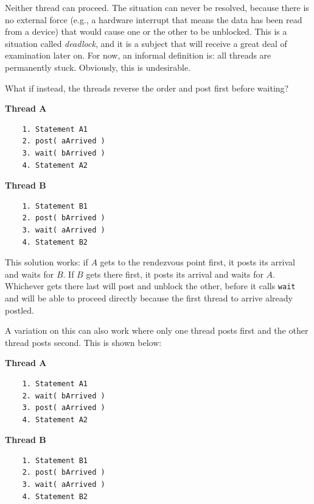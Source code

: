 Neither thread can proceed. The situation can never be resolved, because there is no external force (e.g., a hardware interrupt that means the data has been read from a device) that would cause one or the other to be unblocked. This is a situation called \textit{deadlock}, and it is a subject that will receive a great deal of examination later on. For now, an informal definition is: all threads are permanently stuck. Obviously, this is undesirable.

What if instead, the threads reverse the order and post first before waiting?

\begin{multicols}{2}
\textbf{Thread A}\vspace{-2em}
  \begin{verbatim}
	1. Statement A1
	2. post( aArrived )
	3. wait( bArrived )
	4. Statement A2
  \end{verbatim}
\columnbreak
\textbf{Thread B}\vspace{-2em}
  \begin{verbatim}
	1. Statement B1
	2. post( bArrived )
	3. wait( aArrived )
	4. Statement B2
  \end{verbatim}
\end{multicols}
\vspace{-2em}

This solution works: if $A$ gets to the rendezvous point first, it posts its arrival and waits for $B$. If $B$ gets there first, it posts its arrival and waits for $A$. Whichever gets there last will post and unblock the other, before it calls \texttt{wait} and will be able to proceed directly because the first thread to arrive already postled. 

A variation on this can also work where only one thread posts first and the other thread posts second. This is shown below:

\begin{multicols}{2}
\textbf{Thread A}\vspace{-2em}
  \begin{verbatim}
	1. Statement A1
	2. wait( bArrived )
	3. post( aArrived )
	4. Statement A2
  \end{verbatim}
\columnbreak
\textbf{Thread B}\vspace{-2em}
  \begin{verbatim}
	1. Statement B1
	2. post( bArrived )
	3. wait( aArrived )
	4. Statement B2
  \end{verbatim}
\end{multicols}
\vspace{-2em}

